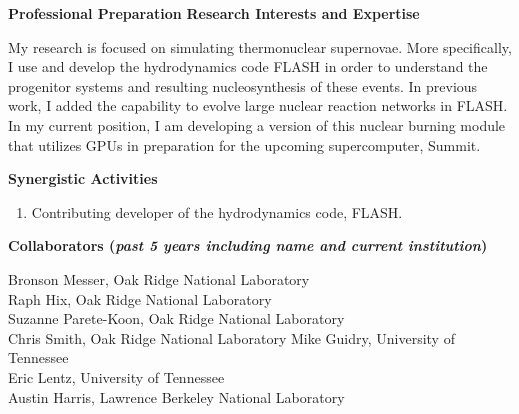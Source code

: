\documentclass[11pt,letterpaper,english]{article}
\begin{document}
\begin{flushleft} {\bf Professional Preparation}
\vspace{-6pt}
{\bf Research Interests and Expertise}
{\parindent 16pt

My research is focused on simulating thermonuclear supernovae. More specifically, I use and develop the hydrodynamics code FLASH in order to understand the progenitor systems and resulting nucleosynthesis of these events. In previous work, I added the capability to evolve large nuclear reaction networks in FLASH. In my current position, I am developing a version of this nuclear burning module that utilizes GPUs in preparation for the upcoming supercomputer, Summit.

}


\vspace{.04in}
{\bf Synergistic Activities}
\vspace{-6pt}
\begin{enumerate} \itemsep1pt \parskip0pt 
\item Contributing developer of the hydrodynamics code, FLASH. \\ 
\end{enumerate} 

\vspace{-6pt}
{\bf Collaborators ({\emph{past 5 years including name and current institution}})} 
{\parindent 16pt


Bronson Messer, Oak Ridge National Laboratory \\
Raph Hix, Oak Ridge National Laboratory \\
Suzanne Parete-Koon, Oak Ridge National Laboratory \\
Chris Smith, Oak Ridge National Laboratory
Mike Guidry, University of Tennessee \\
Eric Lentz, University of Tennessee \\
Austin Harris, Lawrence Berkeley National Laboratory \\
}


\end{flushleft}
\end{document}
